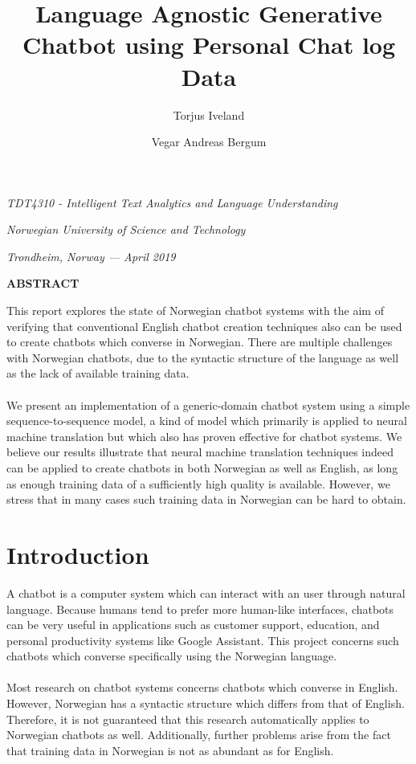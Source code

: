 \documentclass{article}
\title{\textbf{Language Agnostic Generative Chatbot using Personal Chat log
Data}}
\author{Torjus Iveland \and Vegar Andreas Bergum}
\date{}
\renewcommand\abstractname{ABSTRACT}
\renewenvironment{abstract}
 {\small
  \begin{center}
  \bfseries \abstractname\vspace{0em}
  \end{center}
  \list{}{
    \setlength{\leftmargin}{12.5mm}%
    \setlength{\rightmargin}{\leftmargin}%
  }
  \item\relax}
 {\endlist}
\begin{document}
\maketitle
\centerline{\textit{TDT4310 - Intelligent Text Analytics and Language
Understanding}}
\centerline{\textit{Norwegian University of Science and Technology}}
\centerline{\textit{Trondheim, Norway --- April 2019}}
\vspace{6mm} %

\begin{abstract}

This report explores the state of Norwegian chatbot systems with
the aim of verifying that conventional English chatbot creation techniques
also can be used to create chatbots which converse in Norwegian. There are
multiple challenges with Norwegian chatbots, due to the syntactic structure
of the language as well as the lack of available training data.

\paragraph{}
We present an implementation of a generic-domain chatbot system using a simple
sequence-to-sequence model, a kind of model which primarily is applied to
neural machine translation but which also has proven effective for chatbot
systems. We believe our results illustrate that neural machine translation
techniques indeed can be applied to create chatbots in both Norwegian as
well as English, as long as enough training data of a sufficiently high
quality is available. However, we stress that in many cases such training
data in Norwegian can be hard to obtain.
\end{abstract}
\vspace{3mm}

\section*{Introduction}
A chatbot is a computer system which can interact with an user through natural
language. Because humans tend to prefer more human-like interfaces, chatbots can
be very useful in applications
such as customer support, education, and personal productivity systems like
Google Assistant.  This project concerns such chatbots which converse
specifically using the Norwegian language.

\paragraph{}
Most research on chatbot systems concerns chatbots which converse in English.
However, Norwegian has a syntactic structure which differs from that of
English. Therefore, it is not guaranteed that this research automatically
applies to Norwegian chatbots as well. Additionally, further problems arise
from the fact that training data in Norwegian is not as abundant as for
English.
\end{document}
